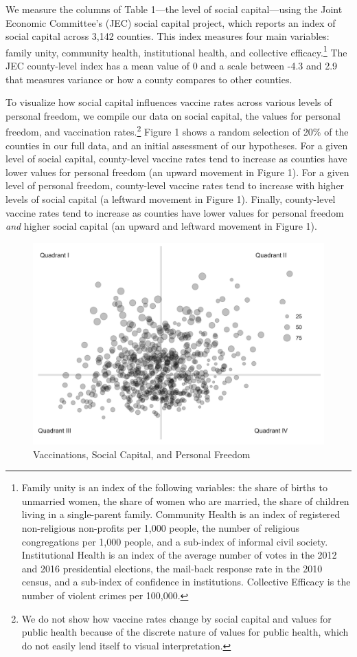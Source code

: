 \documentclass[
]{article}
\begin{document}
We measure the columns of Table 1---the level of social capital---using
the Joint Economic Committee's (JEC) social capital project, which
reports an index of social capital across 3,142 counties. This index
measures four main variables: family unity, community health,
institutional health, and collective efficacy.\footnote{Family unity is
  an index of the following variables: the share of births to unmarried
  women, the share of women who are married, the share of children
  living in a single-parent family. Community Health is an index of
  registered non-religious non-profits per 1,000 people, the number of
  religious congregations per 1,000 people, and a sub-index of informal
  civil society. Institutional Health is an index of the average number
  of votes in the 2012 and 2016 presidential elections, the mail-back
  response rate in the 2010 census, and a sub-index of confidence in
  institutions. Collective Efficacy is the number of violent crimes per
  100,000.} The JEC county-level index has a mean value of 0 and a scale
between -4.3 and 2.9 that measures variance or how a county compares to
other counties.

To visualize how social capital influences vaccine rates across various
levels of personal freedom, we compile our data on social capital, the
values for personal freedom, and vaccination rates.\footnote{We do not
  show how vaccine rates change by social capital and values for public
  health because of the discrete nature of values for public health,
  which do not easily lend itself to visual interpretation.} Figure 1
shows a random selection of 20\% of the counties in our full data, and
an initial assessment of our hypotheses. For a given level of social
capital, county-level vaccine rates tend to increase as counties have
lower values for personal freedom (an upward movement in Figure 1). For
a given level of personal freedom, county-level vaccine rates tend to
increase with higher levels of social capital (a leftward movement in
Figure 1). Finally, county-level vaccine rates tend to increase as
counties have lower values for personal freedom \emph{and} higher social
capital (an upward and leftward movement in Figure 1).

\begin{figure}
\centering
\includegraphics{figures/figure-1.png}
\caption{Vaccinations, Social Capital, and Personal Freedom}
\end{figure}
\end{document}
